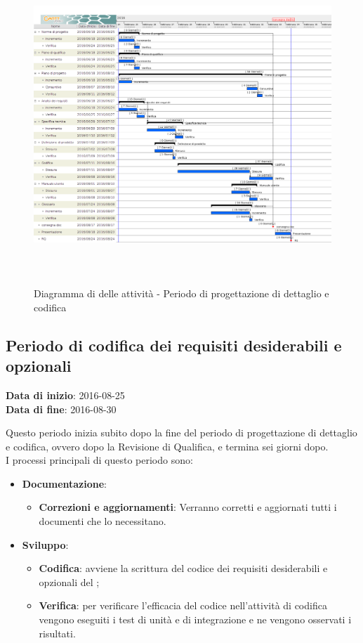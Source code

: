		\begin{figure}[!h]
			\centering
			\includegraphics[height=12cm, width=15cm]{img/gantt/PDC} 
			\caption{Diagramma di  delle attività - Periodo di progettazione di dettaglio e codifica}
		\end{figure}
		
	\subsection{Periodo di codifica dei requisiti desiderabili e opzionali}
	\begin{center}
		\textbf{Data di inizio}: 2016-08-25 \\
		\textbf{Data di fine}: 2016-08-30 \\
	\end{center}
	Questo periodo inizia subito dopo la fine del periodo di progettazione di dettaglio e codifica, ovvero dopo la Revisione di Qualifica, e termina sei giorni dopo. \\
	I processi principali di questo periodo sono: 
		\begin{itemize}
			\item \textbf{Documentazione}:
			\att
			\begin{itemize}
				\item \textbf{Correzioni e aggiornamenti}: Verranno corretti e aggiornati tutti i documenti che lo necessitano. 
			\end{itemize}
			\item \textbf{Sviluppo}:
			\att
			\begin{itemize}
				\item \textbf{Codifica}: avviene la scrittura del codice dei requisiti desiderabili e opzionali del ;
				\item \textbf{Verifica}: per verificare l'efficacia del codice  nell'attività di codifica vengono eseguiti i test di unità e di integrazione e ne vengono osservati i risultati. 
			\end{itemize}
		\end{itemize}
